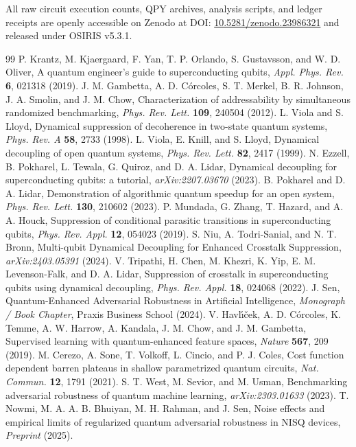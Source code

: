 \documentclass[aps,prl,twocolumn,amsmath,amssymb,superscriptaddress,floatfix]{revtex4-2}
\begin{document}
All raw circuit execution counts, QPY archives, analysis scripts, and ledger receipts are openly accessible on Zenodo at DOI: \href{https://doi.org/10.5281/zenodo.23986321}{10.5281/zenodo.23986321} and released under OSIRIS v5.3.1.

\begin{thebibliography}{99}
 P. Krantz, M. Kjaergaard, F. Yan, T. P. Orlando, S. Gustavsson, and W. D. Oliver, A quantum engineer's guide to superconducting qubits, \textit{Appl. Phys. Rev.} \textbf{6}, 021318 (2019).
 J. M. Gambetta, A. D. C\'orcoles, S. T. Merkel, B. R. Johnson, J. A. Smolin, and J. M. Chow, Characterization of addressability by simultaneous randomized benchmarking, \textit{Phys. Rev. Lett.} \textbf{109}, 240504 (2012).
 L. Viola and S. Lloyd, Dynamical suppression of decoherence in two-state quantum systems, \textit{Phys. Rev. A} \textbf{58}, 2733 (1998).
 L. Viola, E. Knill, and S. Lloyd, Dynamical decoupling of open quantum systems, \textit{Phys. Rev. Lett.} \textbf{82}, 2417 (1999).
 N. Ezzell, B. Pokharel, L. Tewala, G. Quiroz, and D. A. Lidar, Dynamical decoupling for superconducting qubits: a tutorial, \textit{arXiv:2207.03670} (2023).
 B. Pokharel and D. A. Lidar, Demonstration of algorithmic quantum speedup for an open system, \textit{Phys. Rev. Lett.} \textbf{130}, 210602 (2023).
 P. Mundada, G. Zhang, T. Hazard, and A. A. Houck, Suppression of conditional parasitic transitions in superconducting qubits, \textit{Phys. Rev. Appl.} \textbf{12}, 054023 (2019).
 S. Niu, A. Todri-Sanial, and N. T. Bronn, Multi-qubit Dynamical Decoupling for Enhanced Crosstalk Suppression, \textit{arXiv:2403.05391} (2024).
 V. Tripathi, H. Chen, M. Khezri, K. Yip, E. M. Levenson-Falk, and D. A. Lidar, Suppression of crosstalk in superconducting qubits using dynamical decoupling, \textit{Phys. Rev. Appl.} \textbf{18}, 024068 (2022).
 J. Sen, Quantum-Enhanced Adversarial Robustness in Artificial Intelligence, \textit{Monograph / Book Chapter}, Praxis Business School (2024).
 V. Havl{\'\i}{\v{c}}ek, A. D. C{\'o}rcoles, K. Temme, A. W. Harrow, A. Kandala, J. M. Chow, and J. M. Gambetta, Supervised learning with quantum-enhanced feature spaces, \textit{Nature} \textbf{567}, 209 (2019).
 M. Cerezo, A. Sone, T. Volkoff, L. Cincio, and P. J. Coles, Cost function dependent barren plateaus in shallow parametrized quantum circuits, \textit{Nat. Commun.} \textbf{12}, 1791 (2021).
 S. T. West, M. Sevior, and M. Usman, Benchmarking adversarial robustness of quantum machine learning, \textit{arXiv:2303.01633} (2023).
 T. Nowmi, M. A. A. B. Bhuiyan, M. H. Rahman, and J. Sen, Noise effects and empirical limits of regularized quantum adversarial robustness in NISQ devices, \textit{Preprint} (2025).
\end{thebibliography}
\end{document}
